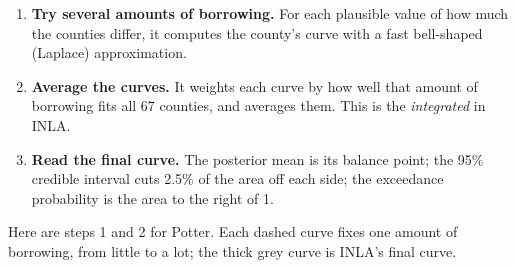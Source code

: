 \documentclass[
  letterpaper,
  DIV=11,
  numbers=noendperiod]{scrartcl}
\providecommand{\tightlist}{%
  \setlength{\itemsep}{0pt}\setlength{\parskip}{0pt}}
\begin{document}
\begin{enumerate}
\def\labelenumi{\arabic{enumi}.}
\tightlist
\item
  \textbf{Try several amounts of borrowing.} For each plausible value of
  how much the counties differ, it computes the county's curve with a
  fast bell-shaped (Laplace) approximation.
\item
  \textbf{Average the curves.} It weights each curve by how well that
  amount of borrowing fits all 67 counties, and averages them. This is
  the \emph{integrated} in INLA.
\item
  \textbf{Read the final curve.} The posterior mean is its balance
  point; the 95\% credible interval cuts 2.5\% of the area off each
  side; the exceedance probability is the area to the right of 1.
\end{enumerate}

Here are steps 1 and 2 for Potter. Each dashed curve fixes one amount of
borrowing, from little to a lot; the thick grey curve is INLA's final
curve.
\end{document}
